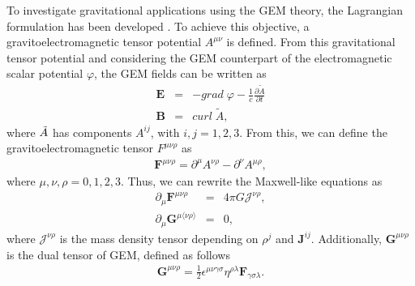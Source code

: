 \documentclass[11pt,showpacs,preprintnumbers,amsmath,amssymb,prd,nofootinbib,superscriptaddress]{revtex4-2}
\begin{document}
To investigate gravitational applications using the GEM theory, the Lagrangian formulation has been developed \cite{Jair}. To achieve this objective, a gravitoelectromagnetic tensor potential $A^{\mu\nu}$ is defined. From this gravitational tensor potential and considering the GEM counterpart of the electromagnetic scalar potential $\varphi$, the GEM fields can be written as
\begin{eqnarray}
    \mathbf{E}&=&-grad\;\varphi-\frac{1}{c}\frac{\partial\widetilde{A}}{\partial t}\nonumber \\ 
    \mathbf{B}&=&curl\;\widetilde{A},
\end{eqnarray}
where $\Tilde{A}$ has components $A^{ij}$, with $i, j = 1, 2, 3$. From this, we can define the gravitoelectromagnetic tensor $F^{\mu\nu\rho}$  as
\begin{eqnarray}
\mathbf{F}^{\mu\nu\rho}=\partial^\mu A^{\nu\rho}-\partial^\nu A^{\mu\rho},
\end{eqnarray}
where $\mu,\nu,\rho=0,1,2,3$. Thus, we can rewrite the Maxwell-like equations as
\begin{eqnarray}
\partial_{\mu} \mathbf{F}^{\mu\nu\rho}&=&4\pi G\mathcal{J}^{\nu\rho},\label{10}\\
\partial_\mu \mathbf{G}^{\mu\langle\nu\rho\rangle}&=&0,\label{11}
\end{eqnarray}
where $\mathcal{J}^{\nu\rho}$ is the mass density tensor depending on $\rho^{j}$ and $\mathbf{J}^{ij}$. Additionally, $\mathbf{G}^{\mu\nu\rho}$  is the dual tensor of GEM, defined as follows
\begin{eqnarray}
\mathbf{G}^{\mu\nu\rho}=\frac{1}{2}\epsilon^{\mu\nu\gamma\sigma} \eta^{\rho\lambda} \mathbf{F}_{\gamma\sigma\lambda}.
\end{eqnarray}
\end{document}
